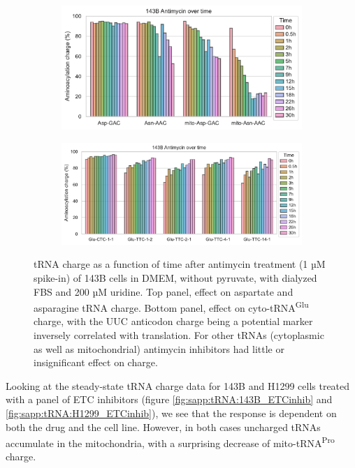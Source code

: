 \begin{figure}[!ht]
     \centering
     \begin{subfigure}[b]{0.6\textwidth}
         \includegraphics[width=\textwidth]{figures/sapp/tRNA/143B_Anti-time_Asp-Asn.pdf}
     \end{subfigure}
     \begin{subfigure}[b]{0.7\textwidth}
         \vspace{5pt}
         \includegraphics[width=\textwidth]{figures/sapp/tRNA/143B_Anti-time_Glu.pdf}
     \end{subfigure}
     \hfill
        \caption[Antimycin time-series in 143B, effect on tRNA charge]{
        tRNA charge as a function of time after antimycin treatment (1 µM spike-in) of 143B cells in DMEM, without pyruvate, with dialyzed FBS and 200 µM uridine.
        Top panel, effect on aspartate and asparagine tRNA charge.
        Bottom panel, effect on cyto-tRNA\textsuperscript{Glu} charge, with the UUC anticodon charge being a potential marker inversely correlated with translation.
        For other tRNAs (cytoplasmic as well as mitochondrial) antimycin inhibitors had little or insignificant effect on charge.
        }
        \label{fig:sapp:tRNA:143B_Anti_time}
\end{figure}


\FloatBarrier
Looking at the steady-state tRNA charge data for 143B and H1299 cells treated with a panel of ETC inhibitors (figure \ref{fig:sapp:tRNA:143B_ETCinhib} and \ref{fig:sapp:tRNA:H1299_ETCinhib}), we see that the response is dependent on both the drug and the cell line.
However, in both cases uncharged tRNAs accumulate in the mitochondria, with a surprising decrease of mito-tRNA\textsuperscript{Pro} charge.

